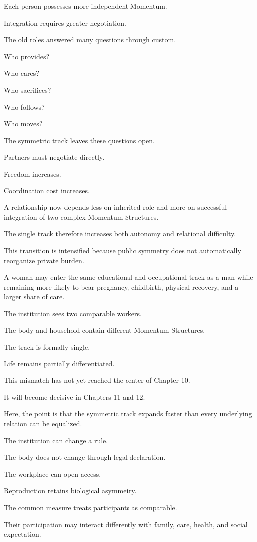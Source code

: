 Each person possesses more independent Momentum.

Integration requires greater negotiation.

The old roles answered many questions through custom.

Who provides?

Who cares?

Who sacrifices?

Who follows?

Who moves?

The symmetric track leaves these questions open.

Partners must negotiate directly.

Freedom increases.

Coordination cost increases.

A relationship now depends less on inherited role and more on successful integration of two complex Momentum Structures.

The single track therefore increases both autonomy and relational difficulty.

This transition is intensified because public symmetry does not automatically reorganize private burden.

A woman may enter the same educational and occupational track as a man while remaining more likely to bear pregnancy, childbirth, physical recovery, and a larger share of care.

The institution sees two comparable workers.

The body and household contain different Momentum Structures.

The track is formally single.

Life remains partially differentiated.

This mismatch has not yet reached the center of Chapter 10.

It will become decisive in Chapters 11 and 12.

Here, the point is that the symmetric track expands faster than every underlying relation can be equalized.

The institution can change a rule.

The body does not change through legal declaration.

The workplace can open access.

Reproduction retains biological asymmetry.

The common measure treats participants as comparable.

Their participation may interact differently with family, care, health, and social expectation.

